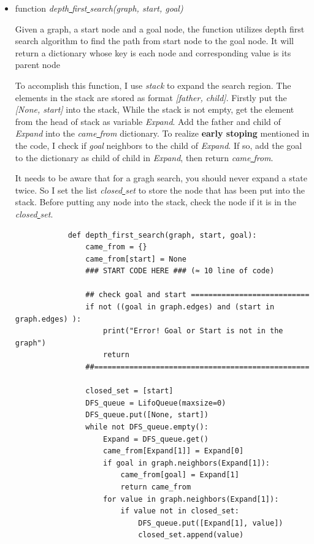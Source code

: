\documentclass[aps,letterpaper,10pt]{revtex4}
\begin{document}
\begin{itemize}
\begin{itemize}
		\item function \emph{depth\underline{ }first\underline{ }search(graph, start, goal)}
		
		Given a graph, a start node and a goal node, 
    	the function utilizes depth first search algorithm to find the path from 
    	start node to the goal node. It will return a dictionary whose key is each node and corresponding  
		value is its parent node
		\vspace{3mm}

		To accomplish this function, I use \emph{stack} to expand the search region. The elements in the stack are stored as format \emph{[father, child]}.
		Firstly put the \emph{[None, start]} into the stack, While the stack is not empty, get the element from the head of stack as variable \emph{Expand}.
		Add the father and child of \emph{Expand} into the \emph{came\underline{ }from} dictionary. 
		To realize \textbf{early stoping} mentioned in the code, I check if \emph{goal} neighbors to the child of \emph{Expand}. If so, add the goal to the dictionary as
		child of child in \emph{Expand}, then return \emph{came\underline{ }from}.
		
		\vspace{3mm}
		It needs to be aware that for a gragh search, you should never expand a state twice. So I set the list \emph{closed\underline{ }set} to store the node that has been put into the stack.
		Before putting any node into the stack, check the node if it is in the \emph{closed\underline{ }set}.

		\begin{lstlisting}
			def depth_first_search(graph, start, goal):
				came_from = {}
				came_from[start] = None
				### START CODE HERE ### (≈ 10 line of code)

				## check goal and start ===========================
				if not ((goal in graph.edges) and (start in graph.edges) ):
					print("Error! Goal or Start is not in the graph")
					return 
				##=================================================

				closed_set = [start]
				DFS_queue = LifoQueue(maxsize=0)
				DFS_queue.put([None, start])
				while not DFS_queue.empty():
					Expand = DFS_queue.get()
					came_from[Expand[1]] = Expand[0]
					if goal in graph.neighbors(Expand[1]):
						came_from[goal] = Expand[1]
						return came_from
					for value in graph.neighbors(Expand[1]):
						if value not in closed_set:
							DFS_queue.put([Expand[1], value])
							closed_set.append(value)


\end{lstlisting}
\end{itemize}
\end{itemize}
\end{document}
